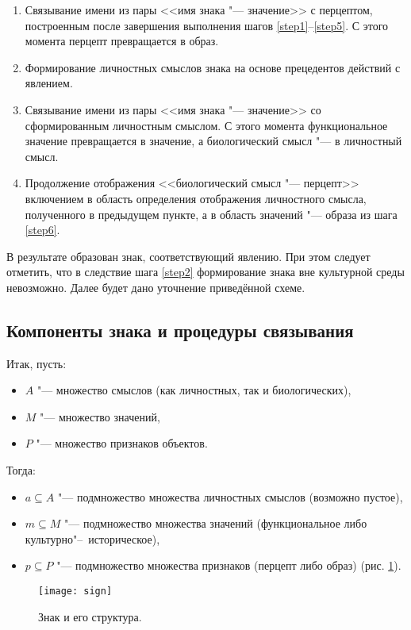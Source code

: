 \begin{enumerate}
	\item\label{step6} Связывание имени из пары <<имя знака "--- значение>> с перцептом, построенным после завершения выполнения шагов \ref{step1}--\ref{step5}. С этого момента перцепт превращается в образ.
	\item Формирование личностных смыслов знака на основе прецедентов действий с явлением.
	\item Связывание имени из пары <<имя знака "--- значение>> со сформированным личностным смыслом. С этого момента функциональное значение превращается в значение, а биологический смысл "--- в личностный смысл.
	\item Продолжение отображения <<биологический смысл "--- перцепт>> включением в область определения отображения личностного смысла, полученного в предыдущем пункте, а в область значений "--- образа из шага \ref{step6}.
\end{enumerate}

В результате образован знак, соответствующий явлению. При этом следует отметить, что в следствие шага \ref{step2} формирование знака вне культурной среды невозможно. Далее будет дано уточнение приведённой схеме.

\subsection{Компоненты знака и процедуры связывания}\label{subsect2_2_1}

Итак, пусть:
\begin{itemize}
	\item $A$ "--- множество смыслов (как личностных, так и биологических),
	\item $M$ "--- множество значений,
	\item $P$ "--- множество признаков объектов.
\end{itemize}

Тогда:
\begin{itemize}
	\item $a\subseteq A$ "--- подмножество множества личностных смыслов (возможно пустое),
	\item $m\subseteq M$ "--- подмножество множества значений (функциональное либо культурно"--~историческое),
	\item $p\subseteq P$ "--- подмножество множества признаков (перцепт либо образ) (рис. \ref{fg:sign}).
\end{itemize}

\begin{figure}[h]
	\centering
	\texttt{[image: sign]}
	\caption{Знак и его структура.}
	\label{fg:sign}
\end{figure}

